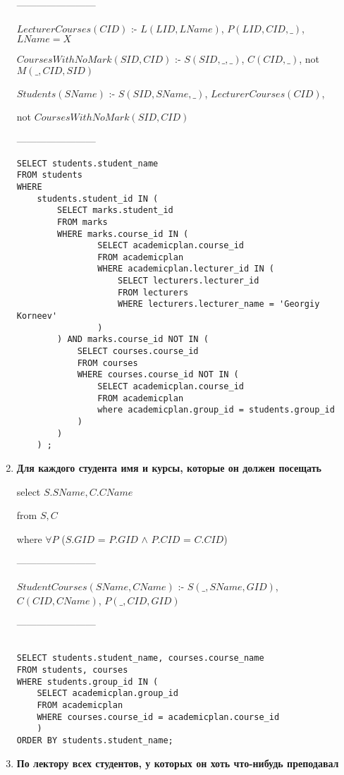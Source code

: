 \documentclass[12pt]{article}
\begin{document}
\begin{enumerate}
		------------------------

     		$LecturerCourses(CID)$ :- $L(LID, LName)$, $P(LID, CID, \_)$, $LName = X$
     		
		$CoursesWithNoMark(SID, CID)$ :-  $S(SID, \_, \_)$, $C(CID, \_)$, not $M(\_, CID, SID)$ 
     		
     		$Students(SName)$ :- $S(SID, SName, \_)$, $LecturerCourses(CID)$, 
     		
     		not $CoursesWithNoMark(SID, CID)$

		------------------------     		
		\begin{verbatim}
SELECT students.student_name
FROM students 
WHERE 
	students.student_id IN (
		SELECT marks.student_id
		FROM marks
		WHERE marks.course_id IN (
				SELECT academicplan.course_id 
				FROM academicplan
				WHERE academicplan.lecturer_id IN (
					SELECT lecturers.lecturer_id
					FROM lecturers
					WHERE lecturers.lecturer_name = 'Georgiy Korneev'
				)			
		) AND marks.course_id NOT IN (
			SELECT courses.course_id
			FROM courses
			WHERE courses.course_id NOT IN (
				SELECT academicplan.course_id 
				FROM academicplan
				where academicplan.group_id = students.group_id
			)
		)
	) ;

		\end{verbatim}
    
    \item \textbf{Для каждого студента имя и курсы, которые он должен посещать}

    		select   $S.SName, C.CName$  
     		
     		from   $S, C$   
     		
     		where  $\forall P$ ($S.GID$ = $P.GID$  $\wedge$ $P.CID$ = $C.CID$)    
        
		------------------------
     		
     		$StudentCourses(SName, CName)$ :- $S(\_, SName, GID)$, $C(CID, CName)$, $P(\_, CID, GID)$
     		
		------------------------     		
     		
		\begin{verbatim}
		
SELECT students.student_name, courses.course_name
FROM students, courses
WHERE students.group_id IN (
	SELECT academicplan.group_id
	FROM academicplan
	WHERE courses.course_id = academicplan.course_id
	)
ORDER BY students.student_name;
		\end{verbatim}
    
    \item \textbf{По лектору всех студентов, у которых он хоть что-нибудь преподавал}


\end{enumerate}
\end{document}
